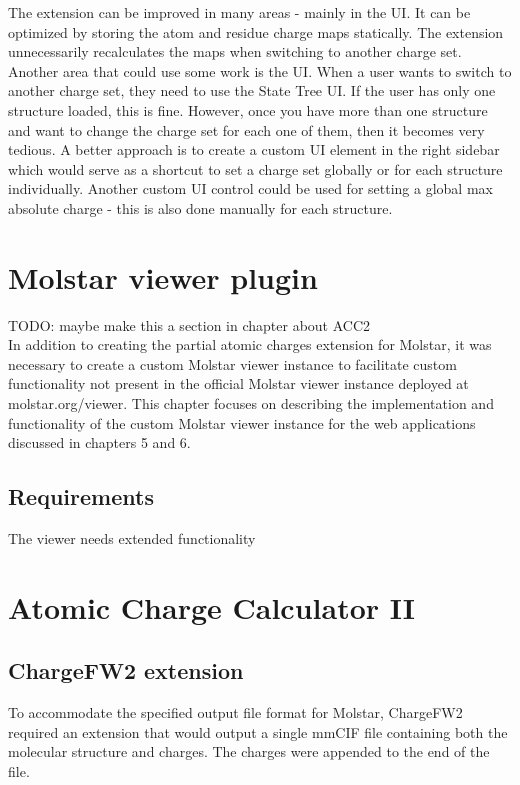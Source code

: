 \documentclass[
  digital,     %
  oneside,     %
  nosansbold,  %
  nocolorbold, %
  lof,         %
  lot,         %
]{fithesis4}
\begin{document}
The extension can be improved in many areas - mainly in the UI. It can be optimized by storing the atom and residue charge maps statically. The extension unnecessarily recalculates the maps when switching to another charge set. Another area that could use some work is the UI. When a user wants to switch to another charge set, they need to use the State Tree UI. If the user has only one structure loaded, this is fine. However, once you have more than one structure and want to change the charge set for each one of them, then it becomes very tedious. A better approach is to create a custom UI element in the right sidebar which would serve as a shortcut to set a charge set globally or for each structure individually. Another custom UI control could be used for setting a global max absolute charge - this is also done manually for each structure.

\chapter{Molstar viewer plugin}

TODO: maybe make this a section in chapter about ACC2 \\

In addition to creating the partial atomic charges extension for Molstar, it was necessary to create a custom Molstar viewer instance to facilitate custom functionality not present in the official Molstar viewer instance deployed at molstar.org/viewer. This chapter focuses on describing the implementation and functionality of the custom Molstar viewer instance for the web applications discussed in chapters 5 and 6.

\section{Requirements}

The viewer needs extended functionality

\chapter{Atomic Charge Calculator II}

\section{ChargeFW2 extension}

To accommodate the specified output file format for Molstar, ChargeFW2 required an extension that would output a single mmCIF file containing both the molecular structure and charges. The charges were appended to the end of the file.
\end{document}

